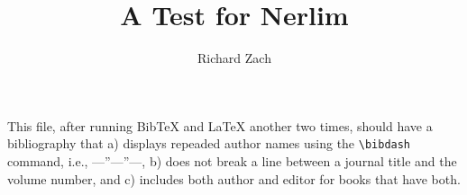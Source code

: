 \documentclass{article}
\title{A Test for Nerlim}
\author{Richard Zach}
\newcommand{\bibdash}{---''---''---}
\begin{document}
\maketitle

This file, after running Bib\TeX{} and \LaTeX{} another two times, should have a bibliography that a) displays repeaded author names using the \verb|\bibdash| command, i.e., \bibdash, b) does not break a line between a journal title and the volume number, and c) includes both author and editor for books that have both.


\cite{*}

\end{document}
